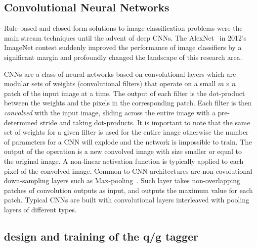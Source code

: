\subsection{Convolutional Neural Networks}
\label{sec:cnn-cnn}

Rule-based and closed-form solutions to image classification problems were the main stream techniques until the advent of deep CNNs. The AlexNet~\cite{AlexNet} in 2012's ImageNet contest suddenly improved the performance of image classifiers by a significant margin and profoundly changed the landscape of this research area.

CNNs are a class of neural networks based on convolutional layers which are modular sets of weights (convolutional filters) that operate on a small $m\times n$ patch of the input image at a time. The output of each filter is the dot-product between the weights and the pixels in the corresponding patch. Each filter is then \emph{convolved} with the input image, sliding across the entire image with a pre-determined stride and taking dot-products. It is important to note that the same set of weights for a given filter is used for the entire image otherwise the number of parameters for a CNN will explode and the network is impossible to train. The output of the operation is a new convolved image with size smaller or equal to the original image. A non-linear activation function is typically applied to each pixel of the convolved image.
Common to CNN architectures are non-covolutional down-sampling layers such as Max-pooling~\cite{MAXPOOL}.
Such layer takes non-overlapping patches of convolution outputs as input, and outputs the maximum value for each patch.
Typical CNNs are built with convolutional layers interleaved with pooling layers of different types. 



\subsection{design and training of the q/g tagger}

